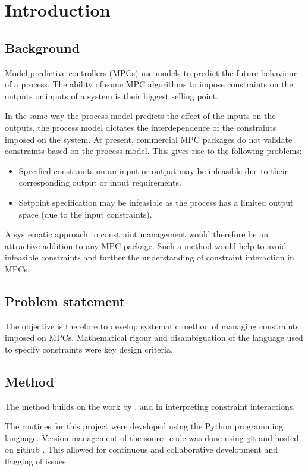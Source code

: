 \chapter{Introduction}\label{chap:intro}
\section{Background}
Model predictive controllers (MPCs) use models to predict the future behaviour of a process.
The ability of some MPC algorithms to impose constraints on the outputs or inputs of a system is their biggest selling point.

In the same way the process model predicts the effect of the inputs on the outputs, the process model dictates the interdependence of the constraints imposed on the system.
At present, commercial MPC packages do not validate constraints based on the process model.
This gives rise to the following problems:
\begin{itemize}
  \item Specified constraints on an input or output may be infeasible due to their corresponding output or input requirements.
  \item Setpoint specification may be infeasible as the process has a limited output space (due to the input constraints).
\end{itemize}

A systematic approach to constraint management would therefore be an attractive addition to any MPC package. 
Such a method would help to avoid infeasible constraints and further the understanding of constraint interaction in MPCs.

\section{Problem statement}
The objective is therefore to develop systematic method of managing constraints imposed on MPCs.
Mathematical rigour and disambiguation of the language used to specify constraints were key design criteria.

\section{Method}
The method builds on the work by \citet{vinsonphd}, \citet{limaphd} and \citet{opconproc} in interpreting constraint interactions.

The routines for this project were developed using the Python \citep{pythonref} programming language.
Version management of the source code was done using git \citep{gitref} and hosted on github \citep{githubref, githubrefcode, githubrefdiss}.
This allowed for continuous and collaborative development and flagging of issues.

